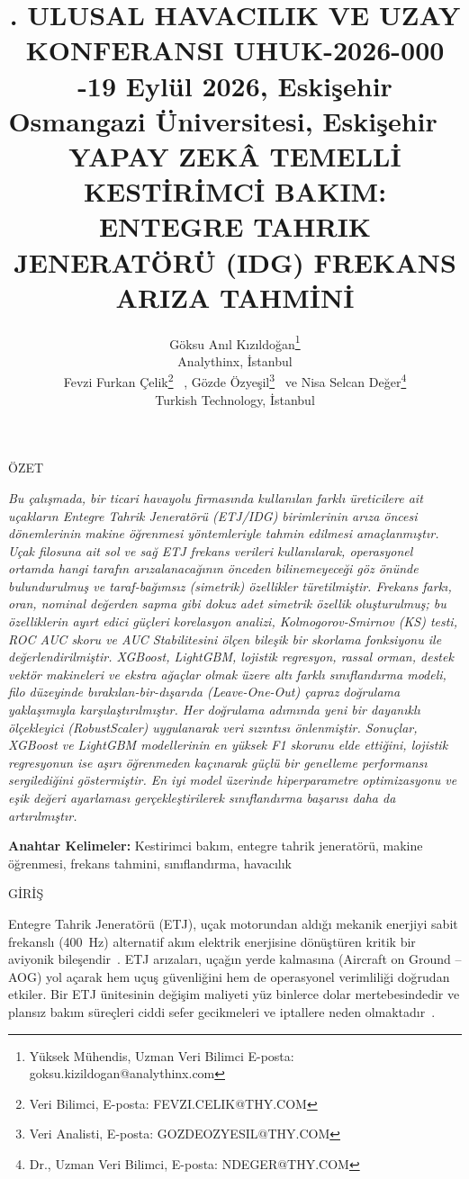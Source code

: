 \documentclass[11pt]{article}
\author{
    \parbox[t]{5cm}{\lsf\centering
            Göksu Anıl Kızıldoğan\thanks{\ssf Yüksek Mühendis, Uzman Veri Bilimci
                            E-posta: goksu.kizildogan@analythinx.com}\\
            \sf
            Analythinx, İstanbul}
    \hspace*{4mm}
    \parbox[t]{5cm}{\lsf\centering
            Fevzi Furkan Çelik\thanks{\ssf Veri Bilimci,
                            E-posta: FEVZI.CELIK@THY.COM}
            ~,
            Gözde Özyeşil\thanks{\ssf Veri Analisti,
                            E-posta: GOZDEOZYESIL@THY.COM}
            ~ve
            Nisa Selcan Değer\thanks{\ssf Dr., Uzman Veri Bilimci,
                            E-posta: NDEGER@THY.COM}\\
            \sf
            Turkish Technology, İstanbul}
}
\def\bildirino{UHUK-2026-000}
\def\Baslik{YAPAY ZEKÂ TEMELLİ KESTİRİMCİ BAKIM: ENTEGRE TAHRIK JENERATÖRÜ (IDG) FREKANS ARIZA TAHMİNİ}
\def\baslik#1{\vspace{2\abovedisplayskip}\centerline{\bsf #1}\nobreak\sloppy}
\begin{document}
\thispagestyle{empty}
\date{}
\title{. ULUSAL HAVACILIK VE UZAY KONFERANSI \hfill
       \lbsf \bildirino\\[-2mm]
       -19 Eylül 2026, Eskişehir Osmangazi Üniversitesi, Eskişehir \hfill~ \\[16mm]
       \lbsf \Baslik }
\maketitle
\raggedright
\sf


\baslik{ÖZET}

{\it Bu çalışmada, bir ticari havayolu firmasında kullanılan farklı üreticilere ait uçakların Entegre Tahrik Jeneratörü (ETJ/IDG) birimlerinin arıza öncesi dönemlerinin makine öğrenmesi yöntemleriyle tahmin edilmesi amaçlanmıştır. Uçak filosuna ait sol ve sağ ETJ frekans verileri kullanılarak, operasyonel ortamda hangi tarafın arızalanacağının önceden bilinemeyeceği göz önünde bulundurulmuş ve taraf-bağımsız (simetrik) özellikler türetilmiştir. Frekans farkı, oran, nominal değerden sapma gibi dokuz adet simetrik özellik oluşturulmuş; bu özelliklerin ayırt edici güçleri korelasyon analizi, Kolmogorov-Smirnov (KS) testi, ROC AUC skoru ve AUC Stabilitesini ölçen bileşik bir skorlama fonksiyonu ile değerlendirilmiştir. XGBoost, LightGBM, lojistik regresyon, rassal orman, destek vektör makineleri ve ekstra ağaçlar olmak üzere altı farklı sınıflandırma modeli, filo düzeyinde bırakılan-bir-dışarıda (Leave-One-Out) çapraz doğrulama yaklaşımıyla karşılaştırılmıştır. Her doğrulama adımında yeni bir dayanıklı ölçekleyici (RobustScaler) uygulanarak veri sızıntısı önlenmiştir. Sonuçlar, XGBoost ve LightGBM modellerinin en yüksek F1 skorunu elde ettiğini, lojistik regresyonun ise aşırı öğrenmeden kaçınarak güçlü bir genelleme performansı sergilediğini göstermiştir. En iyi model üzerinde hiperparametre optimizasyonu ve eşik değeri ayarlaması gerçekleştirilerek sınıflandırma başarısı daha da artırılmıştır.}

{\sf \textbf{Anahtar Kelimeler:} Kestirimci bakım, entegre tahrik jeneratörü, makine öğrenmesi, frekans tahmini, sınıflandırma, havacılık}


\baslik{GİRİŞ}

Entegre Tahrik Jeneratörü (ETJ), uçak motorundan aldığı mekanik enerjiyi sabit frekanslı (400~Hz) alternatif akım elektrik enerjisine dönüştüren kritik bir aviyonik bileşendir~\citep{ref_jing}. ETJ arızaları, uçağın yerde kalmasına (Aircraft on Ground -- AOG) yol açarak hem uçuş güvenliğini hem de operasyonel verimliliği doğrudan etkiler. Bir ETJ ünitesinin değişim maliyeti yüz binlerce dolar mertebesindedir ve plansız bakım süreçleri ciddi sefer gecikmeleri ve iptallere neden olmaktadır~\citep{ref_elattar}.
\end{document}
